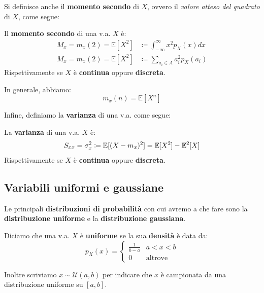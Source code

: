 Si definisce anche il \textbf{momento secondo} di $X$, ovvero il
\textit{valore atteso del quadrato} di $X$, come segue:

\begin{definition}
    Il \textbf{momento secondo} di una v.a. $X$ è:
    \[
        \begin{aligned}
            M_x = m_x(2) = \mathbb{E}[X^2] &\coloneqq \int_{-\infty}^{\infty} x^2 p_X (x) dx \\ 
            M_x = m_x(2) = \mathbb{E}[X^2] &\coloneqq \sum_{a_i \in A} a_i^2 p_X(a_i)
        \end{aligned}
    \] 
    Rispettivamente se $X$ è \textbf{continua} oppure \textbf{discreta}.
\end{definition}

In generale, abbiamo:
\[
    m_x(n) = \mathbb{E}[X^n]
\]

Infine, definiamo la \textbf{varianza} di una v.a. come segue:

\begin{definition}[VARIANZA]
    La \textbf{varianza} di una v.a. $X$ è:
    \[
        S_{xx} = \sigma_x ^2 \coloneqq\mathbb{E}[(X - m_x)^2] = \mathbb{E}[X^2] - \mathbb{E}^2[X] \\ 
    \] 
    Rispettivamente se $X$ è \textbf{continua} oppure \textbf{discreta}.
\end{definition}

\subsection{Variabili uniformi e gaussiane}

Le principali \textbf{distribuzioni di probabilità} con cui avremo a che fare 
sono la \textbf{distribuzione uniforme} e la \textbf{distribuzione gaussiana}.

\begin{definition}
    Diciamo che una v.a. $X$ è \textbf{uniforme} se 
    la sua \textbf{densità} è data da:
    \[
        p_X(x) = \begin{cases}
            \frac{1}{b-a} & a < x < b \\ 
            0 & \text{altrove}
        \end{cases}
    \] 
\end{definition}

Inoltre scriviamo $x\sim \mathcal{U}(a,b)$ per indicare che 
$x$ è campionata da una distribuzione uniforme su $[a,b]$.

